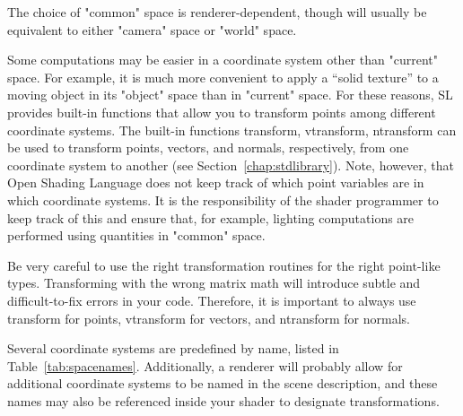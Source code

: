 \documentclass[11pt,letterpaper]{book}
\def\langname{Open Shading Language\xspace}
\def\currentspace{{\cf "current"} space\xspace}
\def\commonspace{{\cf "common"} space\xspace}
\def\worldspace{{\cf "world"} space\xspace}
\def\cameraspace{{\cf "camera"} space\xspace}
\def\objectspace{{\cf "object"} space\xspace}
\begin{document}
The choice of \commonspace is renderer-dependent, though will usually
be equivalent to either \cameraspace or \worldspace.

Some computations may be easier in a coordinate system other than
\currentspace.  For example, it is much more convenient to apply a
``solid texture'' to a moving object in its \objectspace than in
\currentspace.  For these reasons, SL provides built-in functions that
allow you to transform points among different coordinate systems.  The
built-in functions {\cf transform, vtransform, ntransform} can be used
to transform points, vectors, and normals, respectively, from one
coordinate system to another (see Section~\ref{chap:stdlibrary}).  Note,
however, that \langname does not keep track of which point variables are
in which coordinate systems.  It is the responsibility of the shader
programmer to keep track of this and ensure that, for example, lighting
computations are performed using quantities in \commonspace.

Be very careful to use the right transformation routines for the right
point-like types.  Transforming with the wrong matrix math will
introduce subtle and difficult-to-fix errors in your code.  Therefore,
it is important to always use {\cf transform} for points, {\cf
  vtransform} for vectors, and {\cf ntransform} for normals.

Several coordinate systems are predefined by name, listed in
Table~\ref{tab:spacenames}.  Additionally, a renderer will probably
allow for additional coordinate systems to be named in the scene
description, and these names may also be referenced inside your shader
to designate transformations.
\end{document}
